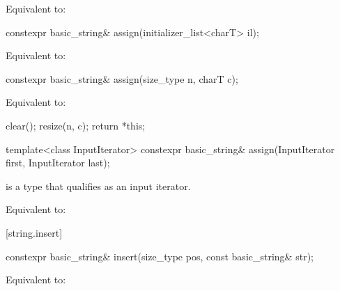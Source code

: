 \begin{itemdescr}
\pnum
\effects
Equivalent to: 
\end{itemdescr}

%
\begin{itemdecl}
constexpr basic_string& assign(initializer_list<charT> il);
\end{itemdecl}

\begin{itemdescr}
\pnum
\effects
Equivalent to: 
\end{itemdescr}

%
\begin{itemdecl}
constexpr basic_string& assign(size_type n, charT c);
\end{itemdecl}

\begin{itemdescr}
\pnum
\effects
Equivalent to:
\begin{codeblock}
clear();
resize(n, c);
return *this;
\end{codeblock}
\end{itemdescr}

%
\begin{itemdecl}
template<class InputIterator>
  constexpr basic_string& assign(InputIterator first, InputIterator last);
\end{itemdecl}

\begin{itemdescr}
\pnum
\constraints
{} is a type that qualifies as an input
iterator.

\pnum
\effects
Equivalent to: 
\end{itemdescr}

[string.insert]{}

%
\begin{itemdecl}
constexpr basic_string& insert(size_type pos, const basic_string& str);
\end{itemdecl}

\begin{itemdescr}
\pnum
\effects
Equivalent to: 
\end{itemdescr}

